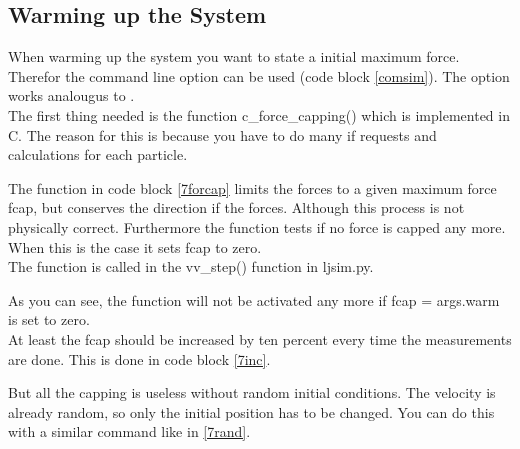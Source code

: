 \subsection{Warming up the System}

When warming up the system you want to state a initial maximum force.
Therefor the command line option  can be used (code block \ref{comsim}).
The option  works analougus to .\\

The first thing needed is the function c\_force\_capping() which is implemented in C. 
The reason for this is because you have to do many if requests and calculations for each particle.


The function in code block \ref{7forcap} limits the forces to a given maximum force fcap, but conserves the direction if the forces. 
Although this process is not physically correct.
Furthermore the function tests if no force is capped any more. 
When this is the case it sets fcap to zero.\\

The function is called in the vv\_step() function in ljsim.py.


As you can see, the function will not be activated any more if fcap = args.warm is set to zero.\\

At least the fcap should be increased by ten percent every time the measurements are done. 
This is done in code block \ref{7inc}.


But all the capping is useless without random initial conditions. 
The velocity is already random, so only the initial position has to be changed. 
You can do this with a similar command like in \ref{7rand}.

